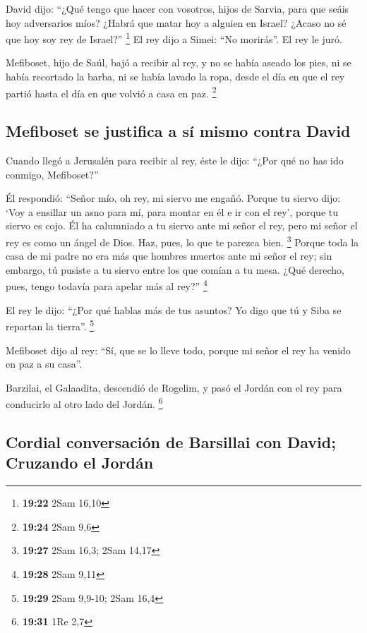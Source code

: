 \begin{paracol}{2}
 David dijo: ``¿Qué tengo que hacer con vosotros, hijos
de Sarvia, para que seáis hoy adversarios míos? ¿Habrá que matar hoy a
alguien en Israel? ¿Acaso no sé que hoy soy rey de Israel?'' \footnote{\textbf{19:22}
  2Sam 16,10}  El rey dijo a Simei: ``No morirás''. El
rey le juró.

 Mefiboset, hijo de Saúl, bajó a recibir al rey, y no se
había aseado los pies, ni se había recortado la barba, ni se había
lavado la ropa, desde el día en que el rey partió hasta el día en que
volvió a casa en paz. \footnote{\textbf{19:24} 2Sam 9,6}

\hypertarget{mefiboset-se-justifica-a-suxed-mismo-contra-david}{%
\subsection{Mefiboset se justifica a sí mismo contra
David}\label{mefiboset-se-justifica-a-suxed-mismo-contra-david}}

 Cuando llegó a Jerusalén para recibir al rey, éste le
dijo: ``¿Por qué no has ido conmigo, Mefiboset?''

 Él respondió: ``Señor mío, oh rey, mi siervo me engañó.
Porque tu siervo dijo: `Voy a ensillar un asno para mí, para montar en
él e ir con el rey', porque tu siervo es cojo.  Él ha
calumniado a tu siervo ante mi señor el rey, pero mi señor el rey es
como un ángel de Dios. Haz, pues, lo que te parezca bien. \footnote{\textbf{19:27}
  2Sam 16,3; 2Sam 14,17}  Porque toda la casa de mi padre
no era más que hombres muertos ante mi señor el rey; sin embargo, tú
pusiste a tu siervo entre los que comían a tu mesa. ¿Qué derecho, pues,
tengo todavía para apelar más al rey?'' \footnote{\textbf{19:28} 2Sam
  9,11}

 El rey le dijo: ``¿Por qué hablas más de tus asuntos? Yo
digo que tú y Siba se repartan la tierra''. \footnote{\textbf{19:29}
  2Sam 9,9-10; 2Sam 16,4}

 Mefiboset dijo al rey: ``Sí, que se lo lleve todo,
porque mi señor el rey ha venido en paz a su casa''.

 Barzilai, el Galaadita, descendió de Rogelim, y pasó el
Jordán con el rey para conducirlo al otro lado del Jordán. \footnote{\textbf{19:31}
  1Re 2,7}

\hypertarget{cordial-conversaciuxf3n-de-barsillai-con-david-cruzando-el-jorduxe1n}{%
\subsection{Cordial conversación de Barsillai con David; Cruzando el
Jordán}\label{cordial-conversaciuxf3n-de-barsillai-con-david-cruzando-el-jorduxe1n}}


\end{paracol}
